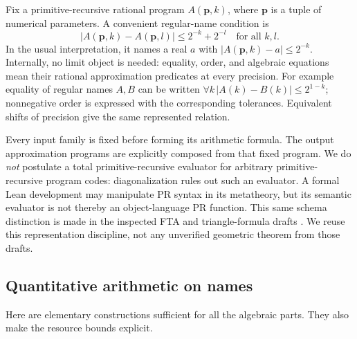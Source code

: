 \documentclass[11pt]{article}
\theoremstyle{definition}\newtheorem{definition}[theorem]{Definition}
\newcommand{\abs}[1]{\left|#1\right|}
\begin{document}
Fix a primitive-recursive rational program $A(\mathbf p,k)$, where
$\mathbf p$ is a tuple of numerical parameters. A convenient regular-name
condition is
\begin{equation}\label{eq:regular}
 \abs{A(\mathbf p,k)-A(\mathbf p,l)}\le2^{-k}+2^{-l}
 \quad\text{for all }k,l.
\end{equation}
In the usual interpretation, it names a real $a$ with
$\abs{A(\mathbf p,k)-a}\le2^{-k}$. Internally, no limit object is needed:
equality, order, and algebraic equations mean their rational approximation
predicates at every precision. For example equality of regular names $A,B$
can be written $\forall k\,\abs{A(k)-B(k)}\le2^{1-k}$; nonnegative order
is expressed with the corresponding tolerances. Equivalent shifts of
precision give the same represented relation.

Every input family is fixed before forming its arithmetic formula. The
output approximation programs are explicitly composed from that fixed
program. We do \emph{not} postulate a total primitive-recursive evaluator
for arbitrary primitive-recursive program codes: diagonalization rules out
such an evaluator. A formal Lean development may manipulate PR syntax in
its metatheory, but its semantic evaluator is not thereby an object-language
PR function. This same schema distinction is made in the inspected FTA and
triangle-formula drafts \cite{drafts}. We reuse this representation
discipline, not any unverified geometric theorem from those drafts.

\subsection{Quantitative arithmetic on names}
Here are elementary constructions sufficient for all the algebraic parts.
They also make the resource bounds explicit.
\end{document}
